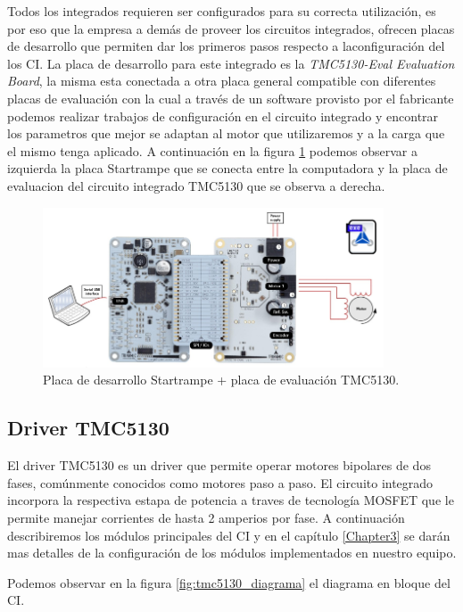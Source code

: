 Todos los integrados requieren ser configurados para su correcta utilización, es por eso que la empresa a demás de proveer los circuitos integrados, ofrecen placas de desarrollo que permiten dar los primeros pasos respecto a laconfiguración del los CI. La placa de desarrollo para este integrado es la \textit{TMC5130-Eval Evaluation Board}, la misma esta conectada a otra placa general compatible con diferentes placas de evaluación con la cual a través de un software provisto por el fabricante podemos realizar trabajos de configuración en el circuito integrado y encontrar los parametros que mejor se adaptan al motor que utilizaremos y a la carga que el mismo tenga aplicado. A continuación en la figura \ref{fig:tmc5130_placa} podemos observar a izquierda la placa Startrampe  que se conecta entre la computadora y la placa de evaluacion del circuito integrado TMC5130 que se observa a derecha.

\begin{figure}[h]
\centering 
\includegraphics[width=0.9\textwidth]{./Figures/tmc5130_placa.png}
\caption{Placa de desarrollo Startrampe + placa de evaluación TMC5130.}
\label{fig:tmc5130_placa}
\end{figure}

  
\subsection{Driver TMC5130}

El driver TMC5130 es un driver que permite operar motores bipolares de dos fases, comúnmente conocidos como motores paso a paso. El circuito integrado incorpora la respectiva estapa de potencia a traves de tecnología MOSFET que le permite manejar corrientes de hasta 2 amperios por fase.
A continuación describiremos los módulos principales del CI y en el capítulo \ref{Chapter3} se darán mas detalles de la configuración de los módulos implementados en nuestro equipo.

Podemos observar en la figura \ref{fig:tmc5130_diagrama} el diagrama en bloque del CI. 

